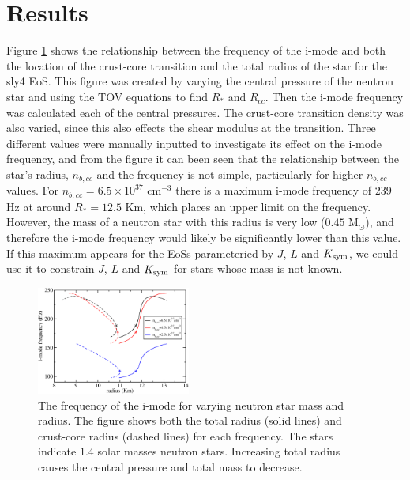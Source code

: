 \documentclass[fleqn,usenatbib]{mnras}
\begin{document}
\section{Results}
\hspace{\parindent}Figure \ref{fig:f_vs_Rcc_R*} shows the relationship between the frequency of the i-mode and both the location of the crust-core transition and the total radius of the star for the sly4 EoS. This figure was created by varying the central pressure of the neutron star and using the TOV equations to find $R_*$ and $R_{cc}$. Then the i-mode frequency was calculated each of the central pressures. The crust-core transition density was also varied, since this also effects the shear modulus at the transition. Three different values were manually inputted to investigate its effect on the i-mode frequency, and from the figure it can been seen that the relationship between the star's radius, $n_{b,cc}$ and the frequency is not simple, particularly for higher $n_{b,cc}$ values. For $n_{b,cc}=6.5\times10^{37}$ cm$^{-3}$ there is a maximum i-mode frequency of $239$ Hz at around $R_*=12.5$ Km, which places an upper limit on the frequency. However, the mass of a neutron star with this radius is very low ($0.45$ M$_{\odot}$), and therefore the i-mode frequency would likely be significantly lower than this value. If this maximum appears for the EoSs parameteried by $J$, $L$ and $K_{\rm sym}$, we could use it to constrain $J$, $L$ and $K_{\rm sym}$ for stars whose mass is not known.

\begin{figure}
\centering
\includegraphics[width=0.45\textwidth,angle=0]{f_Rstar_Rcc_2}
\caption{The frequency of the i-mode for varying neutron star mass and radius. The figure shows both the total radius (solid lines) and crust-core radius (dashed lines) for each frequency. The stars indicate $1.4$ solar masses neutron stars. Increasing total radius causes the central pressure and total mass to decrease.}%
\label{fig:f_vs_Rcc_R*}
\end{figure}
\end{document}
